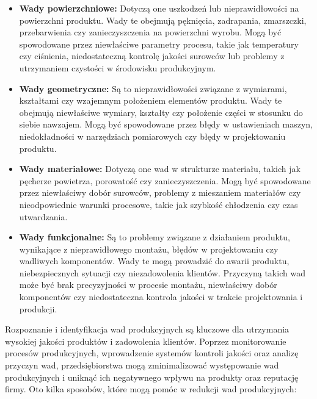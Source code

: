 \begin{itemize}
\item \textbf{Wady powierzchniowe:} Dotyczą one uszkodzeń lub nieprawidłowości na powierzchni produktu. Wady te obejmują pęknięcia, zadrapania, zmarszczki, przebarwienia czy zanieczyszczenia na powierzchni wyrobu. Mogą być spowodowane przez niewłaściwe parametry procesu, takie jak temperatury czy ciśnienia, niedostateczną kontrolę jakości surowców lub problemy z utrzymaniem czystości w środowisku produkcyjnym.

\item \textbf{Wady geometryczne:} Są to nieprawidłowości związane z wymiarami, kształtami czy wzajemnym położeniem elementów produktu. Wady te obejmują niewłaściwe wymiary, kształty czy położenie części w stosunku do siebie nawzajem. Mogą być spowodowane przez błędy w ustawieniach maszyn, niedokładności w narzędziach pomiarowych czy błędy w projektowaniu produktu.

\item \textbf{Wady materiałowe:} Dotyczą one wad w strukturze materiału, takich jak pęcherze powietrza, porowatość czy zanieczyszczenia. Mogą być spowodowane przez niewłaściwy dobór surowców, problemy z mieszaniem materiałów czy nieodpowiednie warunki procesowe, takie jak szybkość chłodzenia czy czas utwardzania.

\item \textbf{Wady funkcjonalne:} Są to problemy związane z działaniem produktu, wynikające z nieprawidłowego montażu, błędów w projektowaniu czy wadliwych komponentów. Wady te mogą prowadzić do awarii produktu, niebezpiecznych sytuacji czy niezadowolenia klientów. Przyczyną takich wad może być brak precyzyjności w procesie montażu, niewłaściwy dobór komponentów czy niedostateczna kontrola jakości w trakcie projektowania i produkcji.

\end{itemize}

Rozpoznanie i identyfikacja wad produkcyjnych są kluczowe dla utrzymania wysokiej jakości produktów i zadowolenia klientów. Poprzez monitorowanie procesów produkcyjnych, wprowadzenie systemów kontroli jakości oraz analizę przyczyn wad, przedsiębiorstwa mogą zminimalizować występowanie wad produkcyjnych i uniknąć ich negatywnego wpływu na produkty oraz reputację firmy. Oto kilka sposobów, które mogą pomóc w redukcji wad produkcyjnych:

